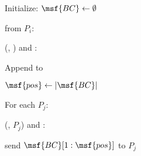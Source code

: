 \begin{bbox}[title={$\mathcal{F}_\msf{Atomic}$}]

Initialize: $\msf{BC} \leftarrow \emptyset$

\OnInput {} from $P_i$:

    \quad \Leak (, \Partyi) and \Eventually:
    
        \qquad Append  to 
        
        \qquad $\msf{pos} \leftarrow |\msf{BC}|$
        
        \qquad For each $P_j$:
            
            \qqquad \Leak (, $P_j$) and \Eventually: 

			\qqqquad send $\msf{BC}[1:\msf{pos}]$ to $P_j$
    
        
\end{bbox}
